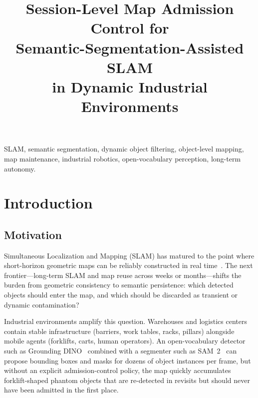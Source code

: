 \documentclass[journal]{IEEEtran}
\begin{document}
\title{Session-Level Map Admission Control for \\ Semantic-Segmentation-Assisted SLAM \\ in Dynamic Industrial Environments}

\author{}
\maketitle

\begin{abstract}

\end{abstract}

\begin{IEEEkeywords}
SLAM, semantic segmentation, dynamic object filtering, object-level mapping, map maintenance, industrial robotics, open-vocabulary perception, long-term autonomy.
\end{IEEEkeywords}

\section{Introduction}
\label{sec:introduction}

\subsection{Motivation}
\label{sec:motivation}

Simultaneous Localization and Mapping (SLAM) has matured to the point where short-horizon geometric maps can be reliably constructed in real time~\cite{cadena2016past}. The next frontier---long-term SLAM and map reuse across weeks or months---shifts the burden from geometric consistency to semantic persistence: which detected objects should enter the map, and which should be discarded as transient or dynamic contamination?

Industrial environments amplify this question. Warehouses and logistics centers contain stable infrastructure (barriers, work tables, racks, pillars) alongside mobile agents (forklifts, carts, human operators). An open-vocabulary detector such as Grounding DINO~\cite{liu2024grounding} combined with a segmenter such as SAM~2~\cite{ravi2024sam2} can propose bounding boxes and masks for dozens of object instances per frame, but without an explicit admission-control policy, the map quickly accumulates forklift-shaped phantom objects that are re-detected in revisits but should never have been admitted in the first place.
\end{document}
